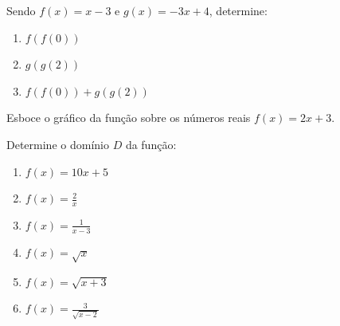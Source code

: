 	\item Sendo $f(x) = x - 3$ e $g(x) = -3x + 4$, determine: 
	\begin{multicols}{3}
	\begin{enumerate}
		\item $f(f(0))$
		\item $g(g(2))$
		\item $f(f(0)) + g(g(2))$
	\end{enumerate}
	\end{multicols}		
	\item Esboce o gráfico da função sobre os números reais $f(x)  = 2x + 3$. 	
	\item Determine o domínio $D$ da função:
	\begin{multicols}{3}	
	\begin{enumerate}
		\item $f(x)=10x+5$
		\item $f(x)=\displaystyle\frac{2}{x}$
		\item $f(x)=\displaystyle\frac{1}{x-3}$
		\item $f(x)=\sqrt{x}$
		\item $f(x)=\sqrt{x+3}$
		\item $f(x)=\displaystyle\frac{3}{\sqrt{x-2}}$
	\end{enumerate}
	\end{multicols}	
	
